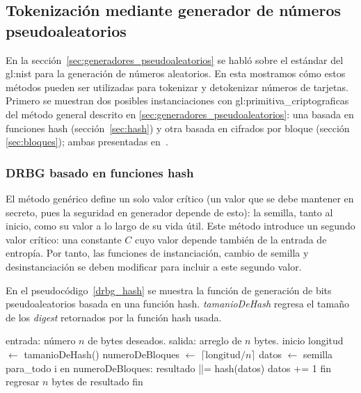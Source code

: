 %
%
%

\subsection{Tokenización mediante generador de números pseudoaleatorios}
\label{sec:drbg_lista}

En la sección~\ref{sec:generadores_pseudoaleatorios} se habló sobre el
estándar del \gls{gl:nist} para la generación de números aleatorios. En esta
mostramos cómo estos métodos pueden ser utilizadas para tokenizar y detokenizar
números de tarjetas. Primero se muestran dos posibles instanciaciones
con \glspl{gl:primitiva_criptografica} del método general descrito en
\ref{sec:generadores_pseudoaleatorios}: una basada en funciones hash
(sección~\ref{sec:hash}) y otra basada en cifrados por bloque (sección
\ref{sec:bloques}); ambas presentadas en~\cite{nist_aleatorios}.

\subsubsection{DRBG basado en funciones hash}

El método genérico define un solo valor crítico (un valor que se debe mantener
en secreto, pues la seguridad en generador depende de esto): la semilla, tanto
al inicio, como su valor a lo largo de su vida útil. Este método introduce
un segundo valor crítico: una constante $ C $ cuyo valor depende también de
la entrada de entropía. Por tanto, las funciones de instanciación,
cambio de semilla y desinstanciación se deben modificar para incluir
a este segundo valor.

En el pseudocódigo~\ref{drbg_hash} se muestra la función de generación de bits
pseudoaleatorios basada en una función hash. \textit{tamanioDeHash} regresa el
tamaño de los \textit{digest} retornados por la función hash usada.

\begin{pseudocodigo}[%
    caption={Generación de bits pseudoaleatorios mediante función hash},
    label={drbg_hash}%
  ]
    entrada: número $ n $ de bytes deseados.
    salida:  arreglo de $ n $ bytes.
    inicio
      longitud $ \gets $ tamanioDeHash()
      numeroDeBloques $ \gets $ $ \lceil \text{longitud} / n \rceil $
      datos $ \gets $ semilla
      para_todo i en numeroDeBloques:
        resultado ||= hash(datos)
        datos += 1
      fin
      regresar $ n $ bytes de resultado
    fin
\end{pseudocodigo}

